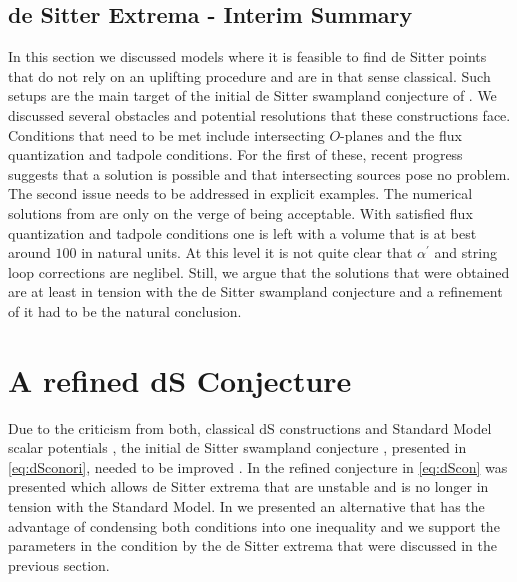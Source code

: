 \documentclass[a4paper,12pt]{report}
\begin{document}
\subsection{de Sitter Extrema - Interim Summary}
In this section we discussed models where it is feasible to find de Sitter points that do not rely on an uplifting procedure and are in that sense classical. Such setups are the main target of the initial de Sitter swampland conjecture of \cite{Obied:2018sgi}. We discussed several obstacles and potential resolutions that these constructions face. Conditions that need to be met include intersecting $O$-planes and the flux quantization and tadpole conditions. For the first of these, recent progress \cite{Junghans:2020acz,Marchesano:2020qvg,Cribiori:2021djm} suggests that a solution is possible and that intersecting sources pose no problem. The second issue needs to be addressed in explicit examples. The numerical solutions from \cite{Danielsson:2012et,Roupec:2018mbn} are only on the verge of being acceptable. With satisfied flux quantization and tadpole conditions one is left with a volume that is at best around $100$ in natural units. At this level it is not quite clear that $\alpha^ \prime$ and string loop corrections are neglibel. Still, we argue that the solutions that were obtained are at least in tension with the de Sitter swampland conjecture and a refinement of it had to be the natural conclusion.

\section{A refined dS Conjecture}
\label{sec:refconj}
Due to the criticism from both, classical dS constructions \cite{Andriot:2018ept,Roupec:2018mbn} and Standard Model scalar potentials \cite{Denef:2018etk,Murayama:2018lie,Choi:2018rze,Hamaguchi:2018vtv}, the initial de Sitter swampland conjecture \cite{Obied:2018sgi}, presented in \eqref{eq:dSconori}, needed to be improved \cite{Andriot:2018wzk,Garg:2018reu}. In \cite{Ooguri:2018wrx} the refined conjecture in \eqref{eq:dScon} was presented which allows de Sitter extrema that are unstable and is no longer in tension with the Standard Model. In \cite{Andriot:2018mav} we presented an alternative that has the advantage of condensing both conditions into one inequality and we support the parameters in the condition by the de Sitter extrema that were discussed in the previous section.
\end{document}
